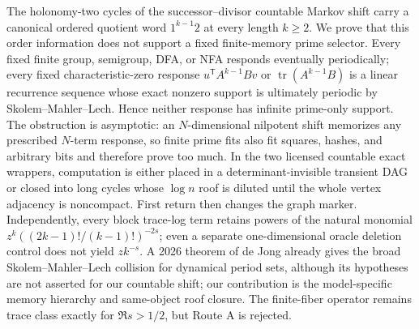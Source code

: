 The holonomy-two cycles of the successor--divisor countable Markov shift
carry a canonical ordered quotient word \(1^{k-1}2\) at every length
\(k\ge2\).  We prove that this order information does not support a fixed
finite-memory prime selector.  Every fixed finite group, semigroup, DFA, or
NFA responds eventually periodically; every fixed characteristic-zero
response \(u^{\mathsf T}A^{k-1}Bv\) or
\(\operatorname{tr}(A^{k-1}B)\) is a linear recurrence sequence whose exact
nonzero support is ultimately periodic by Skolem--Mahler--Lech.  Hence
neither response has infinite prime-only support.  The obstruction is
asymptotic: an \(N\)-dimensional nilpotent shift memorizes any prescribed
\(N\)-term response, so finite prime fits also fit squares, hashes, and
arbitrary bits and therefore prove too much.  In the two licensed countable
exact wrappers, computation is either placed in a determinant-invisible
transient DAG or closed into long cycles whose \(\log n\) roof is diluted
until the whole vertex adjacency is noncompact.  First return then changes
the graph marker.  Independently, every block trace-log term retains powers
of the natural monomial \(z^k((2k-1)!/(k-1)!)^{-2s}\); even a separate
one-dimensional oracle deletion control does not yield \(zk^{-s}\).  A
2026 theorem of de Jong
already gives the broad Skolem--Mahler--Lech collision for dynamical period
sets, although its hypotheses are not asserted for our countable shift; our
contribution is the model-specific memory hierarchy and
same-object roof closure.  The finite-fiber operator remains trace class
exactly for \(\Re s>1/2\), but Route A is rejected.
